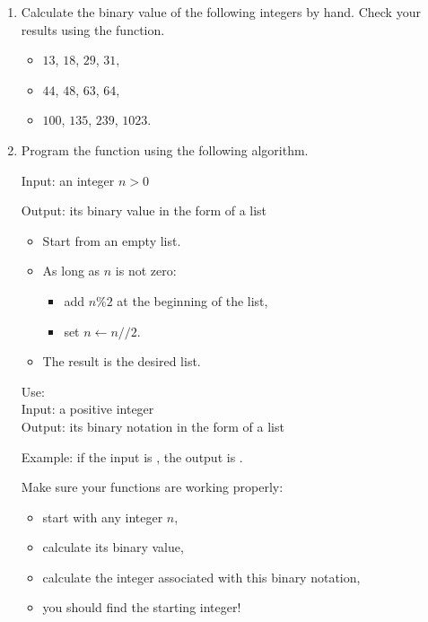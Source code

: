 \documentclass[11pt,class=report,crop=false]{standalone}
\begin{document}
\begin{activite}[]


\begin{enumerate}
  \item Calculate the binary value of the following integers by hand. Check your results using the \Python{}  function.
  
   \begin{itemize}
    \item $13$, $18$, $29$, $31$,
    \item $44$, $48$, $63$, $64$,
    \item $100$, $135$, $239$, $1023$.
  \end{itemize} 
  
  \item
  Program the  function using the following algorithm.

  \begin{algorithme}
  Input: an integer $n>0$

  Output: its binary value in the form of a list

  \begin{itemize}
    \item Start from an empty list.
    
    \item As long as $n$ is not zero:
    
     \begin{itemize} 
       \item add $n \% 2$ at the beginning of the list,
       \item set $n \leftarrow n//2$.
     \end{itemize}    
         
    \item The result is the desired list.
  \end{itemize} 
             
 \end{algorithme}
 
   \begin{fonction}
  Use:  \\
  Input: a positive integer \\
  Output: its binary notation in the form of a list
  
  \medskip  
  Example: if the input is , the output is \ci{[1,1,0,0,1,1,0,0]}.
  \end{fonction} 
  
  Make sure your functions are working properly:
  \begin{itemize}
    \item start with any integer $n$,
    \item calculate its binary value,
    \item calculate the integer associated with this binary notation,
    \item you should find the starting integer!
  \end{itemize}
\end{enumerate}
\end{activite}
\end{document}
